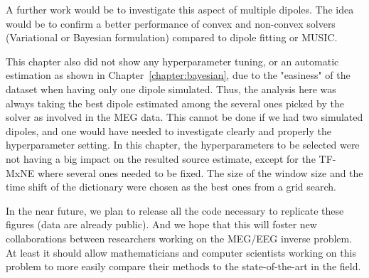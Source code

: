 A further work would be to investigate this aspect of multiple dipoles. The idea would be to confirm a better performance of convex and non-convex solvers (Variational or Bayesian formulation) compared to dipole fitting or MUSIC.

This chapter also did not show any hyperparameter tuning, or an automatic estimation as shown in Chapter~\ref{chapter:bayesian}, due to the "easiness" of the dataset when having only one dipole simulated. Thus, the analysis here was always taking the best dipole estimated among the several ones picked by the solver as involved in the MEG data. This cannot be done if we had two simulated dipoles, and one would have needed to investigate clearly and properly the hyperparameter setting. In this chapter, the hyperparameters to be selected were not having a big impact on the resulted source estimate, except for the TF-MxNE where several ones needed to be fixed. The size of the window size and the time shift of the dictionary were chosen as the best ones from a grid search.

In the near future, we plan to release all the code necessary to replicate these figures (data are already public). And we hope that this will foster new collaborations between researchers working on the MEG/EEG inverse problem. At least it should allow mathematicians and computer scientists working on this problem to more easily compare their methods to the state-of-the-art in the field.
